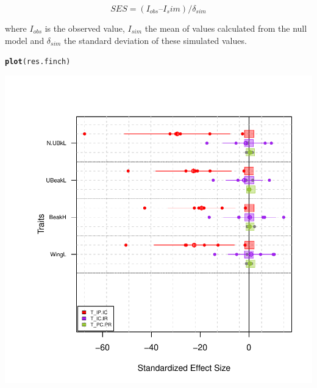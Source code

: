 \documentclass[12pt]{article}\usepackage[]{graphicx}\usepackage[]{color}
\makeatletter
\def\maxwidth{ %
  \ifdim\Gin@nat@width>\linewidth
    \linewidth
  \else
    \Gin@nat@width
  \fi
}
\newcommand{\hlstd}[1]{\textcolor[rgb]{0.345,0.345,0.345}{#1}}%
\newcommand{\hlkwd}[1]{\textcolor[rgb]{0.737,0.353,0.396}{\textbf{#1}}}%
\newenvironment{kframe}{%
 \def\at@end@of@kframe{}%
 \ifinner\ifhmode%
  \def\at@end@of@kframe{\end{minipage}}%
  \begin{minipage}{\columnwidth}%
 \fi\fi%
 \def\FrameCommand##1{\hskip\@totalleftmargin \hskip-\fboxsep
 \colorbox{shadecolor}{##1}\hskip-\fboxsep
     \hskip-\linewidth \hskip-\@totalleftmargin \hskip\columnwidth}%
 \MakeFramed {\advance\hsize-\width
   \@totalleftmargin\z@ \linewidth\hsize
   \@setminipage}}%
 {\par\unskip\endMakeFramed%
 \at@end@of@kframe}
\newenvironment{knitrout}{}{} %
\makeatother
\begin{document}
\begin{center}
$$ SES = (I_{obs} – I{_sim}) / \delta_{sim} $$
\end{center}

where $I_{obs}$ is the observed value, $I_{sim}$ the mean of values calculated from the null model and $\delta_{sim}$ the standard deviation of these simulated values.


\begin{knitrout}
\color{fgcolor}\begin{kframe}
\begin{alltt}
\hlkwd{plot}\hlstd{(res.finch)}
\end{alltt}
\end{kframe}

{\centering \includegraphics[width=\maxwidth]{figure/unnamed-chunk-34-1} 

}



\end{knitrout}
\end{document}
